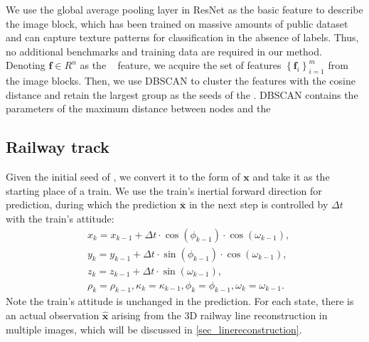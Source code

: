 We use the global average pooling layer in ResNet \citep{resnet} as the basic feature to describe the image block,
which has been trained on massive amounts of public dataset and can capture texture patterns for classification in the absence of labels.
Thus,
no additional benchmarks and training data are required in our method.
Denoting $\mathbf f \in R^n$ as the \rlp~ feature,
we acquire the set of features $\left\{\mathbf f_i\right\}_{i=1}^m$ from the image blocks.
Then,
we use DBSCAN to cluster the features with the cosine distance and retain the largest group as the seeds of the \rlp.
DBSCAN contains the parameters of the maximum distance between nodes and the 

\subsection{Railway track}
\label{sec_kalman}
Given the initial seed of \rlp,
we convert it to the form of $\mathbf x$ and take it as the starting place of a train.
We use the train's inertial forward direction for prediction,
during which the prediction $\bar{\mathbf x}$ in the next step is controlled by $\Delta t$ with the train's attitude:
\begin{equation}
        \begin{aligned}
            & x_k = x_{k-1} + \Delta t \cdot \cos(\phi_{k-1}) \cdot \cos(\omega_{k-1}), \\
            & y_k = y_{k-1} + \Delta t \cdot \sin(\phi_{k-1}) \cdot \cos(\omega_{k-1}), \\
            & z_k = z_{k-1} + \Delta t \cdot \sin(\omega_{k-1}),\\
            &\rho_k=\rho_{k-1},
        \kappa_k=\kappa_{k-1},
        \phi_k=\phi_{k-1},
        \omega_k=\omega_{k-1}.
        \end{aligned}
        \label {eq_statetransition}
\end{equation}
Note the train's attitude is unchanged in the prediction.
For each state,
there is an actual observation $\hat{\mathbf x}$ arising from the 3D railway line reconstruction in multiple images,
which will be discussed in \cref{sec_linereconstruction}.

